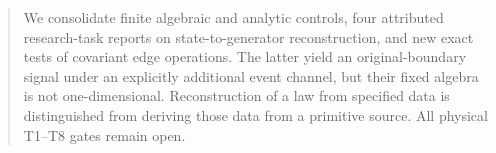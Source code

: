 
\maketitle
\begin{abstract}
We consolidate finite algebraic and analytic controls, four attributed
research-task reports on state-to-generator reconstruction, and new exact
tests of covariant edge operations. The latter yield an original-boundary
signal under an explicitly additional event channel, but their fixed
algebra is not one-dimensional. Reconstruction of a law from specified
data is distinguished from deriving those data from a primitive source.
All physical T1--T8 gates remain open.
\end{abstract}


